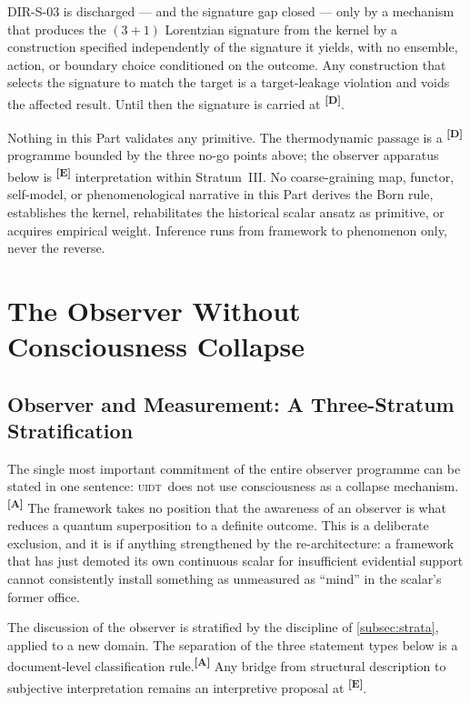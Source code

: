 \documentclass[12pt,a4paper,twoside]{article}
\theoremstyle{plain}
\theoremstyle{definition}
\theoremstyle{remark}
\newcommand{\UIDT}{\textsc{uidt}}
\newcommand{\catmark}[1]{\textsuperscript{\textsf{\textbf{[#1]}}}}
\begin{document}
\begin{killswitch}
DIR-S-03 is discharged --- and the signature gap closed --- only by a
mechanism that produces the $(3{+}1)$ Lorentzian signature from the kernel
by a construction specified independently of the signature it yields, with
no ensemble, action, or boundary choice conditioned on the outcome. Any
construction that selects the signature to match the target is a
target-leakage violation and voids the affected result. Until then the
signature is carried at \catmark{D}.
\end{killswitch}

\begin{governancebox}
Nothing in this Part validates any primitive. The thermodynamic passage
is a \catmark{D} programme bounded by the three no-go points above; the
observer apparatus below is \catmark{E} interpretation within
Stratum~III. No coarse-graining map, functor, self-model, or
phenomenological narrative in this Part derives the Born rule,
establishes the kernel, rehabilitates the historical scalar ansatz as primitive, or acquires
empirical weight. Inference runs from framework to phenomenon only,
never the reverse.
\end{governancebox}

\section{The Observer Without Consciousness Collapse}
\label{sec:observer-no-collapse}

\subsection{Observer and Measurement: A Three-Stratum Stratification}
\label{subsec:observer-stratification}

The single most important commitment of the entire observer programme
can be stated in one sentence: \UIDT\ does not use consciousness as a
collapse mech\-a\-nism.\catmark{A} The framework takes no position that the
awareness of an observer is what reduces a quantum superposition to a
definite outcome. This is a deliberate exclusion, and it is if anything
strengthened by the re-architecture: a framework that has just demoted
its own continuous scalar for insufficient evidential support cannot
consistently install something as unmeasured as ``mind'' in the scalar's
former office.

The discussion of the observer is stratified by the discipline of
\cref{subsec:strata}, applied to a new domain. The separation of the
three statement types below is a document-level classification rule.\catmark{A}
Any bridge from structural description to subjective interpretation remains
an interpretive proposal at \catmark{E}.
\end{document}
